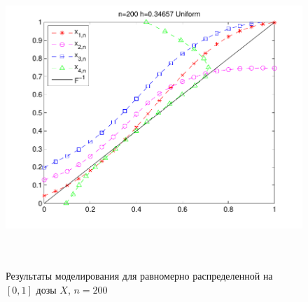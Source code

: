 \documentclass[a4paper,14pt,russian]{article}
\begin{document}
\begin{figure}[ht]
\center
\caption{Результаты моделирования для равномерно распределенной на $[0,1]$ дозы $X$, $n = 200$}
\includegraphics[width = 400pt,height = 320pt]{2.pdf}
\end{figure}
\end{document}
